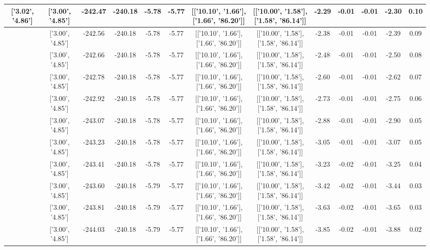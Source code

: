 \begin{table}[htbp]
\begin{adjustbox}{angle=90}
\begin{tabular}{|c|c|c|c|c|c|c|c|c|c|c|c|c|}
 ['3.02', '4.86'] & ['3.00', '4.85'] & -242.47 & -240.18 & -5.78 & -5.77 & [['10.10', '1.66'], ['1.66', '86.20']] & [['10.00', '1.58'], ['1.58', '86.14']] & -2.29 & -0.01 & -0.01 & -2.30 & 0.10\\ \hline
 ['3.02', '4.86'] & ['3.00', '4.85'] & -242.56 & -240.18 & -5.78 & -5.77 & [['10.10', '1.66'], ['1.66', '86.20']] & [['10.00', '1.58'], ['1.58', '86.14']] & -2.38 & -0.01 & -0.01 & -2.39 & 0.09\\ \hline
 ['3.03', '4.86'] & ['3.00', '4.85'] & -242.66 & -240.18 & -5.78 & -5.77 & [['10.10', '1.66'], ['1.66', '86.20']] & [['10.00', '1.58'], ['1.58', '86.14']] & -2.48 & -0.01 & -0.01 & -2.50 & 0.08\\ \hline
 ['3.03', '4.86'] & ['3.00', '4.85'] & -242.78 & -240.18 & -5.78 & -5.77 & [['10.10', '1.66'], ['1.66', '86.20']] & [['10.00', '1.58'], ['1.58', '86.14']] & -2.60 & -0.01 & -0.01 & -2.62 & 0.07\\ \hline
 ['3.04', '4.86'] & ['3.00', '4.85'] & -242.92 & -240.18 & -5.78 & -5.77 & [['10.10', '1.66'], ['1.66', '86.20']] & [['10.00', '1.58'], ['1.58', '86.14']] & -2.73 & -0.01 & -0.01 & -2.75 & 0.06\\ \hline
 ['3.04', '4.86'] & ['3.00', '4.85'] & -243.07 & -240.18 & -5.78 & -5.77 & [['10.10', '1.66'], ['1.66', '86.20']] & [['10.00', '1.58'], ['1.58', '86.14']] & -2.88 & -0.01 & -0.01 & -2.90 & 0.05\\ \hline
 ['3.04', '4.86'] & ['3.00', '4.85'] & -243.23 & -240.18 & -5.78 & -5.77 & [['10.10', '1.66'], ['1.66', '86.20']] & [['10.00', '1.58'], ['1.58', '86.14']] & -3.05 & -0.01 & -0.01 & -3.07 & 0.05\\ \hline
 ['3.05', '4.86'] & ['3.00', '4.85'] & -243.41 & -240.18 & -5.78 & -5.77 & [['10.10', '1.66'], ['1.66', '86.20']] & [['10.00', '1.58'], ['1.58', '86.14']] & -3.23 & -0.02 & -0.01 & -3.25 & 0.04\\ \hline
 ['3.05', '4.86'] & ['3.00', '4.85'] & -243.60 & -240.18 & -5.79 & -5.77 & [['10.10', '1.66'], ['1.66', '86.20']] & [['10.00', '1.58'], ['1.58', '86.14']] & -3.42 & -0.02 & -0.01 & -3.44 & 0.03\\ \hline
 ['3.05', '4.86'] & ['3.00', '4.85'] & -243.81 & -240.18 & -5.79 & -5.77 & [['10.10', '1.66'], ['1.66', '86.20']] & [['10.00', '1.58'], ['1.58', '86.14']] & -3.63 & -0.02 & -0.01 & -3.65 & 0.03\\ \hline
 ['3.06', '4.86'] & ['3.00', '4.85'] & -244.03 & -240.18 & -5.79 & -5.77 & [['10.10', '1.66'], ['1.66', '86.20']] & [['10.00', '1.58'], ['1.58', '86.14']] & -3.85 & -0.02 & -0.01 & -3.88 & 0.02\\ \hline

\end{tabular}
\end{adjustbox}
\end{table}
